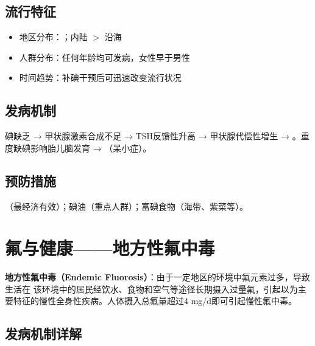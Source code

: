 \subsection{流行特征}

\begin{itemize}[leftmargin=*]
    \item 地区分布：；内陆 $>$ 沿海
    \item 人群分布：任何年龄均可发病，女性早于男性
    \item 时间趋势：补碘干预后可迅速改变流行状况
\end{itemize}

\subsection{发病机制}

碘缺乏 → 甲状腺激素合成不足 → TSH反馈性升高 → 甲状腺代偿性增生 → 。重度缺碘影响胎儿脑发育 → （呆小症）。

\subsection{预防措施}

（最经济有效）；碘油（重点人群）；富碘食物（海带、紫菜等）。

\section{氟与健康——地方性氟中毒}

\begin{defbox}
\textbf{地方性氟中毒（Endemic Fluorosis）}：由于一定地区的环境中氟元素过多，导致生活在 该环境中的居民经饮水、食物和空气等途径长期摄入过量氟，引起以为主要特征的慢性全身性疾病。人体摄入总氟量超过4 mg/d即可引起慢性氟中毒。
\end{defbox}

\subsection{发病机制详解}

